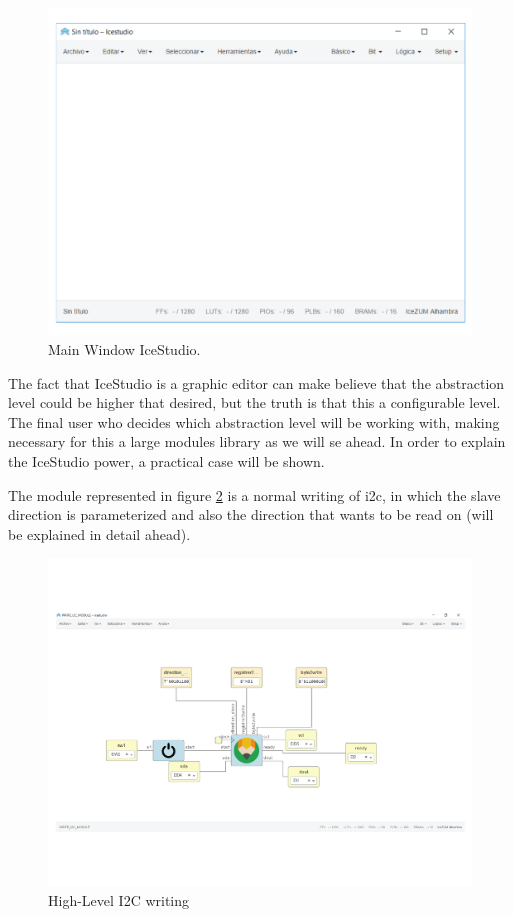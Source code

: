 \begin{figure}[H]
	\center
	\includegraphics[trim = 0mm 20mm 0mm 0mm, clip,scale=0.4]{imagenes/EstadoArte/Main_IceStudio.pdf}
	\caption{Main Window IceStudio.}
	\label{fig:Main_IceStudio}
\end{figure}

The fact that IceStudio is a graphic editor can make believe that the abstraction level could be higher that desired, but the truth is that this a configurable level. The final user who decides which abstraction level will be working with, making necessary for this a large modules library as we will se ahead. In order to explain the IceStudio power, a practical case will be shown.\newline

The module represented in figure \ref{fig:Write_i2c_module} is a normal writing of i2c, in which the slave direction is parameterized and also the direction that wants to be read on (will be explained in detail ahead). \newline

\begin{figure}[H]
	\center
	\includegraphics[trim = 0mm 25mm 0mm 0mm, clip,scale=0.4]{imagenes/EstadoArte/Write_i2c_module.pdf}
	\caption{High-Level I2C writing}
	\label{fig:Write_i2c_module}
\end{figure}

